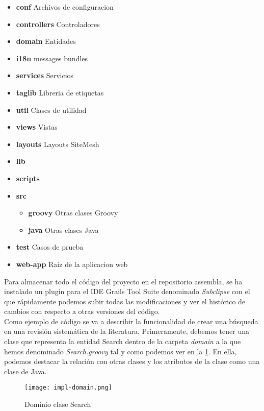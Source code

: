 \begin{itemize}
	\item \textbf{conf} Archivos de configuracion
	\item \textbf{controllers} Controladores
	\item \textbf{domain} Entidades
	\item \textbf{i18n} messages bundles
	\item \textbf{services} Servicios
	\item \textbf{taglib} Libreria de etiquetas
	\item \textbf{util} Clases de utilidad
	\item \textbf{views} Vistas
	\item \textbf{layouts} Layouts SiteMesh
	\item \textbf{lib}
	\item \textbf{scripts}
	\item \textbf{src}
	
	\begin{itemize}
		\item \textbf{groovy} Otras clases Groovy
		\item \textbf{java} Otras clases Java
	\end{itemize}
	
	\item \textbf{test} Casos de prueba
	\item \textbf{web-app} Raiz de la aplicacion web
\end{itemize}

Para almacenar todo el código del proyecto en el repositorio assembla, se ha instalado un plugin para el IDE Grails Tool Suite denominado \textit{Subclipse} con el que rápidamente podemos subir todas las modificaciones y ver el histórico de cambios con respecto a otras versiones del código.\\

Como ejemplo de código se va a describir la funcionalidad de crear una búsqueda en una revisión sistemática de la literatura. Primeramente, debemos tener una clase que representa la entidad Search dentro de la carpeta \textit{domain} a la que hemos denominado \textit{Search.groovy} tal y como podemos ver en la \ref{fig:impl-domain}. En ella, podemos destacar la relación con otras clases y los atributos de la clase como una clase de Java.\\

\begin{figure}[!hpt]
	\begin{center} 
		\texttt{[image: impl-domain.png]}
		\caption{Dominio clase Search}
		\label{fig:impl-domain}
	\end{center}
\end{figure}

